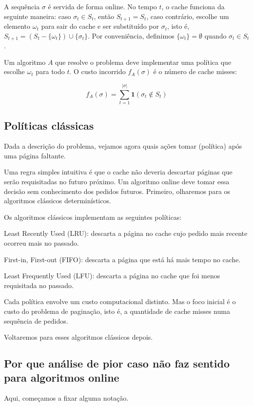 \documentclass[a4paper,oneside,reqno,12pt]{amsart}
\begin{document}
A sequência $\sigma$ é servida de forma online. No tempo $t$, o cache funciona da seguinte maneira: caso $\sigma_t \in S_t$, então $S_{t+1} = S_t$, caso contrário, escolhe um elemento $\omega_t$ para sair do cache e ser substituído por $\sigma_t$, isto é, $S_{t+1} = (S_t - \{\omega_t\}) \cup \{\sigma_t\}$. Por conveniência, definimos $\{\omega_t\} = \emptyset$ quando $\sigma_t \in S_t$.

Um algoritmo $A$ que resolve o problema deve implementar uma política que escolhe $\omega_t$ para todo $t$. O custo incorrido $f_A(\sigma)$ é o número de cache misses:

\[ f_A(\sigma) = \sum_{t = 1}^{|\sigma|} \mathbf{1}(\sigma_t \notin S_t)\]

\subsection{Políticas clássicas}

Dada a descrição do problema, vejamos agora quais ações tomar (política) após uma página faltante. 

Uma regra simples intuitiva é que o cache não deveria descartar páginas que serão requisitadas no futuro próximo. Um algoritmo online deve tomar essa decisão sem conhecimento dos pedidos futuros. Primeiro, olharemos para os algoritmos clássicos determinísticos.

Os algoritmos clássicos implementam as seguintes políticas:

Least Recently Used (LRU): descarta a página no cache cujo pedido mais recente ocorreu mais no passado.

First-in, First-out (FIFO): descarta a página que está há mais tempo no cache.

Least Frequently Used (LFU): descarta a página no cache que foi menos requisitada no passado.

Cada política envolve um custo computacional distinto. Mas o foco inicial é o custo do problema de paginação, isto é, a quantidade de cache misses numa sequência de pedidos.

Voltaremos para esses algoritmos clássicos depois.

\subsection{Por que análise de pior caso não faz sentido para algoritmos online}

Aqui, começamos a fixar alguma notação.
\end{document}
